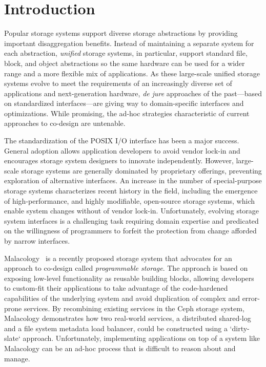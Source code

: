 \section{Introduction}
\label{sec:intro}

Popular storage systems support diverse storage abstractions by
providing important disaggregation benefits. Instead of maintaining
a separate system for each abstraction, \emph{unified} storage
systems, in particular, support standard file, block, and object abstractions so the same
hardware can be used for a wider range and a more flexible mix of applications. 
As these large-scale unified storage systems evolve to meet the requirements 
of an increasingly diverse set of applications and next-generation hardware, \emph{de jure}
approaches of the past---based on standardized interfaces---are giving way to
domain-specific interfaces and optimizations. While promising, the ad-hoc strategies characteristic of 
current approaches to co-design are untenable.

The standardization of the POSIX I/O interface has been a major success. General adoption
allows application developers to avoid vendor lock-in and encourages storage system
designers to innovate independently. However, large-scale storage systems are generally dominated 
by proprietary offerings, preventing exploration of alternative
interfaces. An increase in the number of special-purpose storage systems characterizes recent history
in the field, including the emergence of high-performance, and highly modifiable, open-source storage systems, 
which enable system changes without of vendor lock-in. Unfortunately, evolving storage system
interfaces is a challenging task requiring domain expertise and predicated on the willingness of
programmers to forfeit the protection from change afforded by narrow
interfaces.

Malacology~\cite{sevilla:eurosys17} is a recently proposed storage system that
advocates for an approach to co-design called \emph{programmable storage}. The
approach is based on exposing low-level functionality as reusable building
blocks, allowing developers to custom-fit their applications to take advantage
of the code-hardened capabilities of the underlying system and avoid
duplication of complex and error-prone services. By recombining existing
services in the Ceph storage system, Malacology demonstrates how two
real-world services, a distributed shared-log and a file system metadata load
balancer, could be constructed using a `dirty-slate` approach. Unfortunately, implementing
applications on top of a system like Malacology can be an ad-hoc process
that is difficult to reason about and manage.

